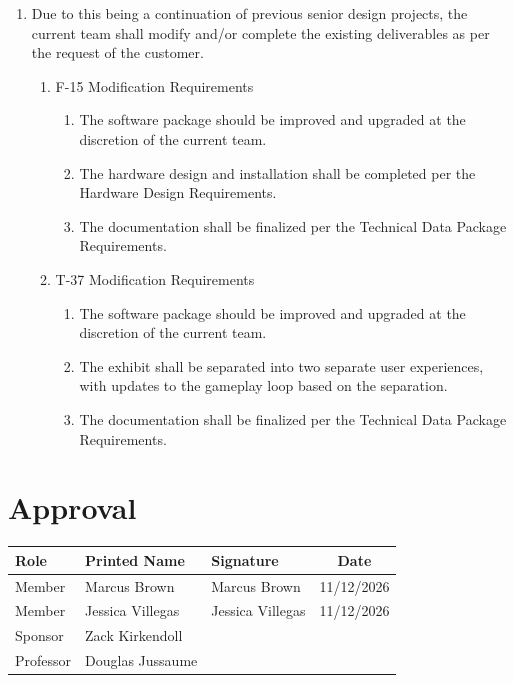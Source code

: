 \documentclass[12pt]{article} %
\newcommand{\signature}[1]{{\calligra\large #1}} %
\begin{document}
\begin{enumerate}[label=\arabic*, leftmargin=*]
	\item Due to this being a continuation of previous senior design projects, the current team shall modify and/or complete the existing deliverables as per the request of the customer.
	\begin{enumerate}[label=\arabic{enumi}.\arabic*, leftmargin=*]
		\item F-15 Modification Requirements
		\begin{enumerate}[label=\arabic{enumi}.\arabic{enumii}.\arabic*, leftmargin=*]
			\item The software package should be improved and upgraded at the discretion of the current team. 
			\item The hardware design and installation shall be completed per the Hardware Design Requirements. 
			\item The documentation shall be finalized per the Technical Data Package Requirements. 
		\end{enumerate}
		\item T-37 Modification Requirements
		\begin{enumerate}[label=\arabic{enumi}.\arabic{enumii}.\arabic*, leftmargin=*]
			\item The software package should be improved and upgraded at the discretion of the current team.
			\item The exhibit shall be separated into two separate user experiences, with updates to the gameplay loop based on the separation.
			\item The documentation shall be finalized per the Technical Data Package Requirements. 
		\end{enumerate}
	\end{enumerate}
\end{enumerate}

\newpage

\section{Approval}

\begin{center}
\begin{tabular}{lllc}
\toprule
\textbf{Role} & \textbf{Printed Name} & \textbf{Signature} & \textbf{Date} \\ 
\midrule
Member & Marcus Brown & \signature{Marcus Brown} & 11/12/2026 \\ 
\midrule
Member & Jessica Villegas & \signature{Jessica Villegas} & 11/12/2026 \\ 
\midrule
Sponsor & Zack Kirkendoll &   &  \\ 
\midrule
Professor & Douglas Jussaume & & \\
\bottomrule
\end{tabular}
\end{center}
\end{document}

